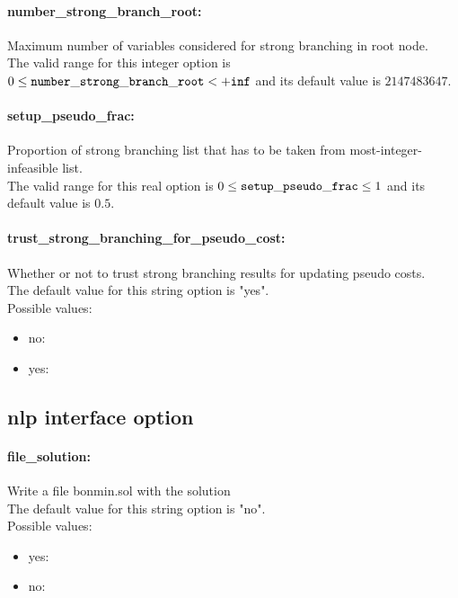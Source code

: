 \paragraph{number\_strong\_branch\_root:}\label{sec:number_strong_branch_root} Maximum number of variables considered for strong branching in root node. $\;$ \\
 The valid range for this integer option is
$0 \le {\tt number\_strong\_branch\_root } <  {\tt +inf}$
and its default value is $2147483647$.


\paragraph{setup\_pseudo\_frac:}\label{sec:setup_pseudo_frac} Proportion of strong branching list that has to be taken from most-integer-infeasible list. $\;$ \\
 The valid range for this real option is 
$0 \le {\tt setup\_pseudo\_frac } \le 1$
and its default value is $0.5$.


\paragraph{trust\_strong\_branching\_for\_pseudo\_cost:}\label{sec:trust_strong_branching_for_pseudo_cost} Whether or not to trust strong branching results for updating pseudo costs. $\;$ \\

The default value for this string option is "yes".
\\ 
Possible values:
\begin{itemize}
   \item no: 
   \item yes: 
\end{itemize}

\subsection{nlp interface option}
\label{sec:nlp_interface_option}
\paragraph{file\_solution:}\label{sec:file_solution} Write a file bonmin.sol with the solution $\;$ \\

The default value for this string option is "no".
\\ 
Possible values:
\begin{itemize}
   \item yes: 
   \item no: 
\end{itemize}

